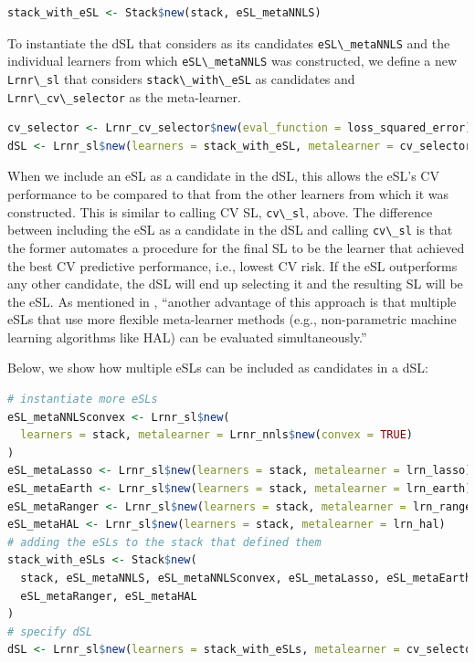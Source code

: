 \documentclass[
  12pt, krantz2,
]{krantz}
\newcommand{\passthrough}[1]{#1}
\newcommand{\1}{\mathbbm{1}}
\theoremstyle{definition}
\theoremstyle{definition}
\theoremstyle{definition}
\theoremstyle{definition}
\theoremstyle{remark}
\begin{document}
\begin{lstlisting}[language=R]
stack_with_eSL <- Stack$new(stack, eSL_metaNNLS)
\end{lstlisting}

To instantiate the dSL that considers as its candidates \passthrough{\lstinline!eSL\_metaNNLS!} and the
individual learners from which \passthrough{\lstinline!eSL\_metaNNLS!} was constructed, we define
a new \passthrough{\lstinline!Lrnr\_sl!} that considers \passthrough{\lstinline!stack\_with\_eSL!} as candidates and
\passthrough{\lstinline!Lrnr\_cv\_selector!} as the meta-learner.

\begin{lstlisting}[language=R]
cv_selector <- Lrnr_cv_selector$new(eval_function = loss_squared_error)
dSL <- Lrnr_sl$new(learners = stack_with_eSL, metalearner = cv_selector)
\end{lstlisting}

When we include an eSL as a candidate in the dSL, this allows the eSL's CV
performance to be compared to that from the other learners from which it was
constructed. This is similar to calling CV SL, \passthrough{\lstinline!cv\_sl!}, above. The difference
between including the eSL as a candidate in the dSL and calling \passthrough{\lstinline!cv\_sl!} is that
the former automates a procedure for the final SL to be the learner that
achieved the best CV predictive performance, i.e., lowest CV risk. If the eSL
outperforms any other candidate, the dSL will end up selecting it and the
resulting SL will be the eSL. As mentioned in \citet{rvp2022super}, ``another advantage
of this approach is that multiple eSLs that use more flexible meta-learner
methods (e.g., non-parametric machine learning algorithms like HAL) can be
evaluated simultaneously.''

Below, we show how multiple eSLs can be included as candidates in a dSL:

\begin{lstlisting}[language=R]
# instantiate more eSLs
eSL_metaNNLSconvex <- Lrnr_sl$new(
  learners = stack, metalearner = Lrnr_nnls$new(convex = TRUE)
)
eSL_metaLasso <- Lrnr_sl$new(learners = stack, metalearner = lrn_lasso)
eSL_metaEarth <- Lrnr_sl$new(learners = stack, metalearner = lrn_earth)
eSL_metaRanger <- Lrnr_sl$new(learners = stack, metalearner = lrn_ranger)
eSL_metaHAL <- Lrnr_sl$new(learners = stack, metalearner = lrn_hal)
# adding the eSLs to the stack that defined them
stack_with_eSLs <- Stack$new(
  stack, eSL_metaNNLS, eSL_metaNNLSconvex, eSL_metaLasso, eSL_metaEarth, 
  eSL_metaRanger, eSL_metaHAL
)
# specify dSL
dSL <- Lrnr_sl$new(learners = stack_with_eSLs, metalearner = cv_selector)
\end{lstlisting}
\end{document}
